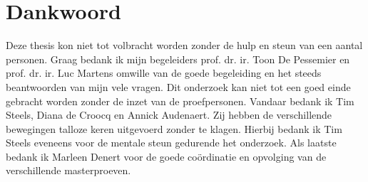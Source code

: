 \chapter*{Dankwoord}
Deze thesis kon niet tot volbracht worden zonder de hulp en steun van een aantal personen. Graag bedank ik mijn begeleiders prof. dr. ir. Toon De Pessemier en prof. dr. ir. Luc Martens omwille van de goede begeleiding en het steeds beantwoorden van mijn vele vragen.
Dit onderzoek kan niet tot een goed einde gebracht worden zonder de inzet van de proefpersonen. Vandaar bedank ik Tim Steels, Diana de Croocq en Annick Audenaert. Zij hebben de verschillende bewegingen talloze keren uitgevoerd zonder te klagen. Hierbij bedank ik Tim Steels eveneens voor de mentale steun gedurende het onderzoek.
Als laatste bedank ik Marleen Denert voor de goede coördinatie en opvolging van de verschillende masterproeven.